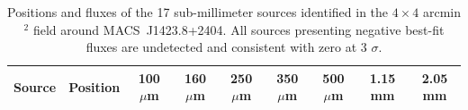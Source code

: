 \documentclass[twocolumn,traditabstract]{aa}
\begin{document}
\begin{table}[h]
\caption{Positions and fluxes of the 17 sub-millimeter sources identified in the $4 \times 4$ arcmin$^2$ field around \mbox{MACS~J1423.8+2404}. All sources presenting negative best-fit fluxes are undetected and consistent with zero at 3 $\sigma$.}
\begin{center}
\begin{tabular}{ccccccccc}
\hline
\hline
Source & Position & 100 $\mu$m & 160 $\mu$m & 250 $\mu$m & 350 $\mu$m & 500 $\mu$m & 1.15 mm & 2.05 mm\\
\hline

\end{tabular}
\end{center}
\end{table}
\end{document}
